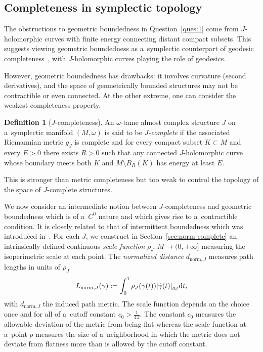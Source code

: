 \documentclass[10pt,a4paper]{amsart}
\numberwithin{equation}{section}
\theoremstyle{definition}
\newtheorem{df}[Theorem]{Definition}
\begin{document}
\subsection{Completeness in symplectic topology}\label{subsec:IntroCompleteness}
The obstructions to geometric boundedness in Question~\ref{ques:1} come from $J$-holomorphic curves with finite energy connecting distant compact subsets. This suggests viewing geometric boundedness as a~symplectic counterpart of geodesic completeness~\cite{McDuffSymplecticStructures}, with $J$-holomorphic curves playing the role of geodesics.

However, geometric boundedness has drawbacks: it involves curvature (second derivatives), and the space of geometrically bounded structures may not be contractible or even connected. At the other extreme, one can consider the weakest completeness property.

\begin{df}[$J$-completeness]\label{df:Jcomplete}
An $\omega$-tame almost complex structure $J$ on a~symplectic manifold $(M,\omega)$ is said to be \emph{$J$-complete} if the associated Riemannian metric $g_J$ is complete and for every compact subset $K\subset M$ and every $E>0$ there exists $R>0$ such that any connected $J$-holomorphic curve whose boundary meets both $K$ and $M\setminus B_R(K)$ has energy at least $E$.
\end{df}
This is stronger than metric completeness but too weak to control the topology of the space of $J$-complete structures.

We now consider an intermediate notion between $J$-completeness and geometric boundedness which is of a~$C^0$ nature and which gives rise to a~contractible condition. It is closely related to that of intermittent boundedness which was introduced in~\cite{GromanFloerOpen}. For each $J$, we construct in Section~\ref{sec:norm-complete} an intrinsically defined continuous \emph{scale function} $\rho_J\colon M\to(0,+\infty]$ measuring the isoperimetric scale at each point. The \emph{normalized distance} $d_{\mathrm{norm},J}$ measures path lengths in units of $\rho_J$
\[
L_{\mathrm{norm},J}(\gamma):=\int_{0}^{1}\rho_J(\gamma(t))|\dot\gamma(t)|_{g_J}{\rm d}t,
\]
with $d_{\mathrm{norm},J}$ the induced path metric. The scale function depends on the choice once and for all of a~cutoff constant $c_0>\frac1{4\pi}$. The constant $c_0$ measures the allowable deviation of the metric from being flat whereas the scale function at a~point $p$ measures the size of a~neighborhood in which the metric does not deviate from flatness more than is allowed by the cutoff constant.
\end{document}
